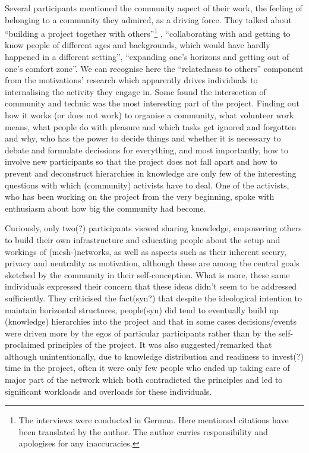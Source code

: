 Several participants mentioned the community aspect of their work, the feeling of belonging to a community they admired, as a driving force.
They talked about ``building a project together with others''\footnote{The interviews were conducted in German. Here mentioned citations have been translated by the author. The author carries responsibility and apologises for any inaccuracies.}
, ``collaborating with and getting to know people of different ages and backgrounds, which would have hardly happened in a different setting'', ``expanding one's horizons and getting out of one's comfort zone''.
We can recognise here the ``relatedness to others'' component from the motivations' research which apparently drives individuals to internalising the activity they engage in.
Some found the intersection of community and technic was the most interesting part of the project.
Finding out how it works (or does not work) to organise a community, what volunteer work means, what people do with pleasure and which tasks get ignored and forgotten and why, who has the power to decide things and whether it is necessary to debate and formulate decissions for everything, and most importantly, how to involve new participants so that the project does not fall apart and how to prevent and deconstruct hierarchies in knowledge are only few of the interesting questions with which (community) activists have to deal.
One of the activists, who has been working on the project from the very beginning, spoke with enthusiasm about how big the community had become.

Curiously, only two(?) participants viewed sharing knowledge, empowering others to build their own infrastructure and educating people about the setup and workings of (mesh-)networks, as well as aspects such as their inherent secury, privacy and neutrality as motivation, although these are among the central goals sketched by the community in their self-conception\cite{ffweb}.
What is more, these same individuals expressed their concern that these ideas didn't seem to be addressed sufficiently.
They criticised the fact(syn?) that despite the ideological intention to maintain horizontal structures, people(syn) did tend to eventually build up (knowledge) hierarchies into the project and that in some cases decisions/events were driven more by the egos of particular participants rather than by the self-proclaimed principles of the project.
It was also suggested/remarked that although unintentionally, due to knowledge distribution and readiness to invest(?) time in the project, often it were only few people who ended up taking care of major part of the network which both contradicted the principles and led to significant workloads and overloads for these individuals.

